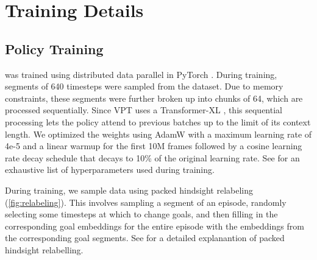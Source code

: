 \section{Training Details}
\subsection{Policy Training}

\agentname{} was trained using distributed data parallel in PyTorch \citep{pytorch}. During training, segments of 640 timesteps were sampled from the dataset. Due to memory constraints, these segments were further broken up into chunks of 64, which are processed sequentially. Since VPT uses a Transformer-XL \citep{txl}, this sequential processing lets the policy attend to previous batches up to the limit of its context length. We optimized the weights using AdamW \citep{adamw} with a maximum learning rate of 4e-5 and a linear warmup for the first 10M frames followed by a cosine learning rate decay schedule that decays to 10\% of the original learning rate. See  for an exhaustive list of hyperparameters used during training.

During training, we sample data using packed hindsight relabeling (\autoref{fig:relabeling}). This involves sampling a segment of an episode, randomly selecting some timesteps at which to change goals, and then filling in the corresponding goal embeddings for the entire episode with the embeddings from the corresponding goal segments. See  for a detailed explanantion of packed hindsight relabelling.

